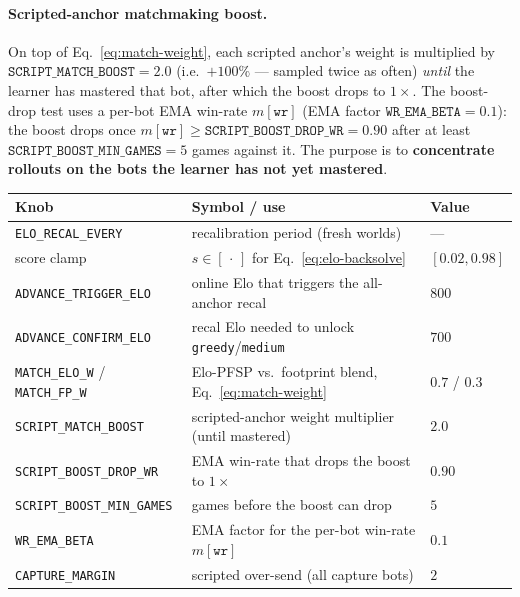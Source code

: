 \documentclass[11pt]{article}
\begin{document}
\paragraph{Scripted-anchor matchmaking boost.} On top of Eq.~\eqref{eq:match-weight}, each scripted
anchor's weight is multiplied by $\texttt{SCRIPT\_MATCH\_BOOST}=2.0$ (i.e.\ $+100\%$ --- sampled twice
as often) \emph{until} the learner has mastered that bot, after which the boost drops to $1\times$. The
boost-drop test uses a per-bot EMA win-rate $m[\texttt{wr}]$ (EMA factor $\texttt{WR\_EMA\_BETA}=0.1$):
the boost drops once $m[\texttt{wr}]\ge\texttt{SCRIPT\_BOOST\_DROP\_WR}=0.90$ after at least
$\texttt{SCRIPT\_BOOST\_MIN\_GAMES}=5$ games against it. The purpose is to \textbf{concentrate rollouts on
the bots the learner has not yet mastered}.
\begin{center}\small
\begin{tabular}{@{}lll@{}}
\toprule
Knob & Symbol / use & Value \\
\midrule
\texttt{ELO\_RECAL\_EVERY} & recalibration period (fresh worlds) & --- \\
score clamp & $s\in[\,\cdot\,]$ for Eq.~\eqref{eq:elo-backsolve} & $[0.02,0.98]$ \\
\texttt{ADVANCE\_TRIGGER\_ELO} & online Elo that triggers the all-anchor recal & $800$ \\
\texttt{ADVANCE\_CONFIRM\_ELO} & recal Elo needed to unlock \texttt{greedy}/\texttt{medium} & $700$ \\
\texttt{MATCH\_ELO\_W} / \texttt{MATCH\_FP\_W} & Elo-PFSP vs.\ footprint blend, Eq.~\eqref{eq:match-weight} & $0.7$ / $0.3$ \\
\texttt{SCRIPT\_MATCH\_BOOST} & scripted-anchor weight multiplier (until mastered) & $2.0$ \\
\texttt{SCRIPT\_BOOST\_DROP\_WR} & EMA win-rate that drops the boost to $1\times$ & $0.90$ \\
\texttt{SCRIPT\_BOOST\_MIN\_GAMES} & games before the boost can drop & $5$ \\
\texttt{WR\_EMA\_BETA} & EMA factor for the per-bot win-rate $m[\texttt{wr}]$ & $0.1$ \\
\texttt{CAPTURE\_MARGIN} & scripted over-send (all capture bots) & $2$ \\
\bottomrule
\end{tabular}
\end{center}
\end{document}
